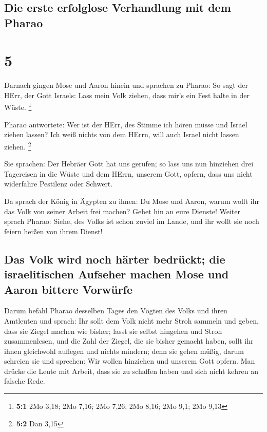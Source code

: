 \hypertarget{die-erste-erfolglose-verhandlung-mit-dem-pharao}{%
\subsection{Die erste erfolglose Verhandlung mit dem
Pharao}\label{die-erste-erfolglose-verhandlung-mit-dem-pharao}}

\hypertarget{section-4}{%
\section{5}\label{section-4}}

 Darnach gingen Mose und Aaron hinein und sprachen zu
Pharao: So sagt der HErr, der Gott Israels: Lass mein Volk ziehen, dass
mir's ein Fest halte in der Wüste. \footnote{\textbf{5:1} 2Mo 3,18; 2Mo
  7,16; 2Mo 7,26; 2Mo 8,16; 2Mo 9,1; 2Mo 9,13}

 Pharao antwortete: Wer ist der HErr, des Stimme ich hören
müsse und Israel ziehen lassen? Ich weiß nichts von dem HErrn, will auch
Israel nicht lassen ziehen. \footnote{\textbf{5:2} Dan 3,15}

 Sie sprachen: Der Hebräer Gott hat uns gerufen; so lass
uns nun hinziehen drei Tagereisen in die Wüste und dem HErrn, unserem
Gott, opfern, dass uns nicht widerfahre Pestilenz oder Schwert.

 Da sprach der König in Ägypten zu ihnen: Du Mose und
Aaron, warum wollt ihr das Volk von seiner Arbeit frei machen? Gehet hin
an eure Dienste!  Weiter sprach Pharao: Siehe, des Volks
ist schon zuviel im Lande, und ihr wollt sie noch feiern heißen von
ihrem Dienst!

\hypertarget{das-volk-wird-noch-huxe4rter-bedruxfcckt-die-israelitischen-aufseher-machen-mose-und-aaron-bittere-vorwuxfcrfe}{%
\subsection{Das Volk wird noch härter bedrückt; die israelitischen
Aufseher machen Mose und Aaron bittere
Vorwürfe}\label{das-volk-wird-noch-huxe4rter-bedruxfcckt-die-israelitischen-aufseher-machen-mose-und-aaron-bittere-vorwuxfcrfe}}

 Darum befahl Pharao desselben Tages den Vögten des Volks
und ihren Amtleuten und sprach:  Ihr sollt dem Volk nicht
mehr Stroh sammeln und geben, dass sie Ziegel machen wie bisher; lasst
sie selbst hingehen und Stroh zusammenlesen,  und die Zahl
der Ziegel, die sie bisher gemacht haben, sollt ihr ihnen gleichwohl
auflegen und nichts mindern; denn sie gehen müßig, darum schreien sie
und sprechen: Wir wollen hinziehen und unserem Gott opfern.
 Man drücke die Leute mit Arbeit, dass sie zu schaffen
haben und sich nicht kehren an falsche Rede.

